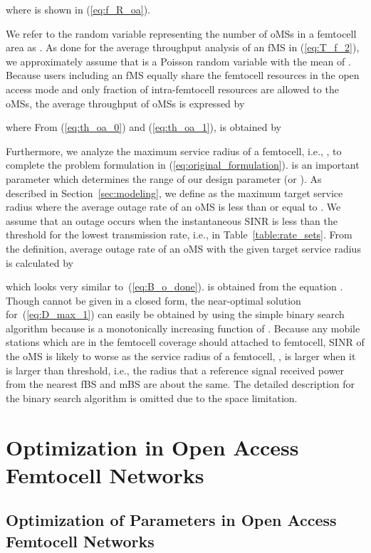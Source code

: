 \documentclass[journal]{IEEEtran}
\begin{document}
where  is shown in (\ref{eq:f_R_oa}).


We refer to the random variable representing the number of oMSs in a
femtocell area as .
As done for the average throughput analysis of an fMS
in (\ref{eq:T_f_2}), we approximately assume that  is
a Poisson random variable with the mean of .
Because  users including an fMS equally share
the femtocell resources in the open access mode
and only  fraction of intra-femtocell resources are allowed
to the oMSs,
the average throughput of oMSs is expressed by

where
{\small
}
From (\ref{eq:th_oa_0}) and (\ref{eq:th_oa_1}),  is obtained by


Furthermore, we analyze the maximum service radius of a femtocell, i.e., ,
to complete the problem formulation in (\ref{eq:original_formulation}).
 is an important parameter which determines the range of our design
parameter  (or ).
As described in Section~\ref{sec:modeling}, we define  as the maximum
target service radius where the average outage rate of an oMS is less than or equal to
.
We assume that an outage occurs when the
instantaneous SINR is less than the threshold for the lowest transmission rate,
i.e.,  in Table~\ref{table:rate_sets}.
From the definition, average outage rate of an oMS with the given target service radius  is calculated by

which looks very similar to~(\ref{eq:B_o_done}).
 is obtained from the equation .
Though  cannot be given in a closed form, the near-optimal solution for~(\ref{eq:D_max_1}) can
easily be obtained by using the simple binary search algorithm because
 is a monotonically increasing function of .
Because any mobile stations which are in the femtocell coverage should attached to femtocell, SINR of the oMS is likely to worse as the service radius of a femtocell, , is larger when it is larger than threshold, i.e., the radius that a reference signal received power from the nearest fBS and mBS are about the same.
The detailed description for the binary search algorithm is omitted due to the space limitation.


\section{Optimization in Open Access Femtocell Networks}
\label{sec:optimization_open}

\subsection{Optimization of Parameters in Open Access Femtocell Networks}
\label{subsec:optimization}
\end{document}
